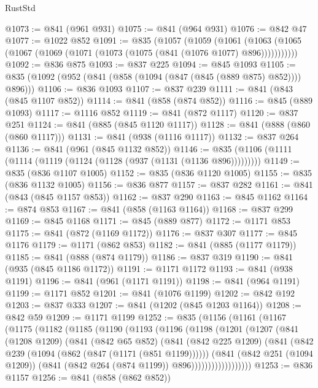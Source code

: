 \begin{lexlean}{RustStd}
\begin{coremodule}
{\begin{coremodule}
{{{{{{{{{{@1073 := @841 (@961 @931)
@1075 := @841 (@964 @931)
@1076 := @842 @47
@1077 := @1022 @852
@1091 := @835
    (@1057
      (@1059
        (@1061 (@1063 (@1065 (@1067 (@1069 (@1071 (@1073 (@1075 (@841 (@1076 @1077) @896)))))))))))
@1092 := @836 @875
@1093 := @837 @225
@1094 := @845 @1093
@1105 := @835 (@1092 (@952 (@841 (@858 (@1094 (@847 (@845 (@889 @875) @852)))) @896)))
@1106 := @836 @1093
@1107 := @837 @239
@1111 := @841 (@843 (@845 @1107 @852))
@1114 := @841 (@858 (@874 @852))
@1116 := @845 (@889 @1093)
@1117 := @1116 @852
@1119 := @841 (@872 @1117)
@1120 := @837 @251
@1124 := @841 (@885 (@845 @1120 @1117))
@1128 := @841 (@888 (@860 (@860 @1117)))
@1131 := @841 (@938 (@1116 @1117))
@1132 := @837 @264
@1136 := @841 (@961 (@845 @1132 @852))
@1146 := @835 (@1106 (@1111 (@1114 (@1119 (@1124 (@1128 (@937 (@1131 (@1136 @896)))))))))
@1149 := @835 (@836 @1107 @1005)
@1152 := @835 (@836 @1120 @1005)
@1155 := @835 (@836 @1132 @1005)
@1156 := @836 @877
@1157 := @837 @282
@1161 := @841 (@843 (@845 @1157 @853))
@1162 := @837 @290
@1163 := @845 @1162
@1164 := @874 @853
@1167 := @841 (@858 (@1163 @1164))
@1168 := @837 @299
@1169 := @845 @1168
@1171 := @845 (@889 @877)
@1172 := @1171 @853
@1175 := @841 (@872 (@1169 @1172))
@1176 := @837 @307
@1177 := @845 @1176
@1179 := @1171 (@862 @853)
@1182 := @841 (@885 (@1177 @1179))
@1185 := @841 (@888 (@874 @1179))
@1186 := @837 @319
@1190 := @841 (@935 (@845 @1186 @1172))
@1191 := @1171 @1172
@1193 := @841 (@938 @1191)
@1196 := @841 (@961 (@1171 @1191))
@1198 := @841 (@964 @1191)
@1199 := @1171 @852
@1201 := @841 (@1076 @1199)
@1202 := @842 @192
@1203 := @837 @333
@1207 := @841 (@1202 (@845 @1203 @1164))
@1208 := @842 @59
@1209 := @1171 @1199
@1252 := @835
    (@1156
      (@1161
        (@1167
          (@1175
            (@1182
              (@1185
                (@1190
                  (@1193
                    (@1196
                      (@1198
                        (@1201
                          (@1207
                            (@841
                              (@1208 @1209)
                              (@841
                                (@842 @65 @852)
                                (@841
                                  (@842 @225 @1209)
                                  (@841
                                    (@842 @239 (@1094 (@862 (@847 (@1171 (@851 @1199))))))
                                    (@841
                                      (@842 @251 (@1094 @1209))
                                      (@841 (@842 @264 (@874 @1199)) @896))))))))))))))))))
@1253 := @836 @1157
@1256 := @841 (@858 (@862 @852))
}}}}}}}}}}
\end{coremodule}}
\end{coremodule}
\end{lexlean}

